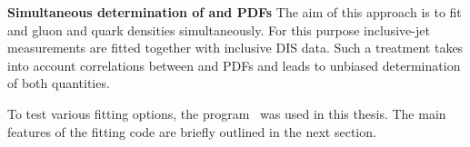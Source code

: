 {\flushleft \textbf{Simultaneous determination of \asz and PDFs}}\newline
The aim of this approach is to fit \asz and gluon and quark densities simultaneously. For this purpose inclusive-jet measurements are fitted together with inclusive DIS data. Such a treatment takes into account correlations between \as and PDFs and leads to unbiased determination of both quantities. %

To test various fitting options, the \herafitter program~\cite{Aaron:2009aa,Aaron:2009kv} was used in this thesis. The main features of the fitting code are briefly outlined in the next section. 